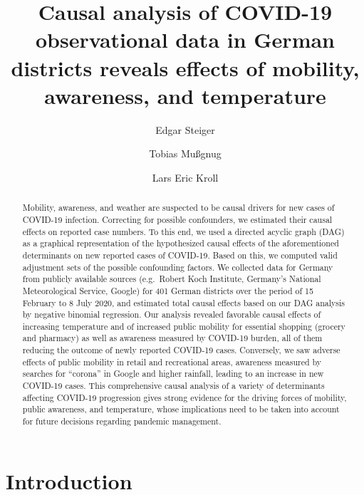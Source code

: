 \documentclass[]{elsarticle} %
\begin{document}
\begin{frontmatter}

  \title{Causal analysis of COVID-19 observational data in German districts
reveals effects of mobility, awareness, and temperature}
    \author[Zi]{Edgar Steiger}
    \author[Zi]{Tobias Mußgnug}
    \author[Zi]{Lars Eric Kroll}
      \address[Zi]{Central Research Institute of Ambulatory Health Care in Germany (Zi),
Salzufer 8, D-10587 Berlin, Germany}
    
  \begin{abstract}
  Mobility, awareness, and weather are suspected to be causal drivers for
  new cases of COVID-19 infection. Correcting for possible confounders, we
  estimated their causal effects on reported case numbers. To this end, we
  used a directed acyclic graph (DAG) as a graphical representation of the
  hypothesized causal effects of the aforementioned determinants on new
  reported cases of COVID-19. Based on this, we computed valid adjustment
  sets of the possible confounding factors. We collected data for Germany
  from publicly available sources (e.g.~Robert Koch Institute, Germany's
  National Meteorological Service, Google) for 401 German districts over
  the period of 15 February to 8 July 2020, and estimated total causal
  effects based on our DAG analysis by negative binomial regression. Our
  analysis revealed favorable causal effects of increasing temperature and
  of increased public mobility for essential shopping (grocery and
  pharmacy) as well as awareness measured by COVID-19 burden, all of them
  reducing the outcome of newly reported COVID-19 cases. Conversely, we
  saw adverse effects of public mobility in retail and recreational areas,
  awareness measured by searches for ``corona'' in Google and higher
  rainfall, leading to an increase in new COVID-19 cases. This
  comprehensive causal analysis of a variety of determinants affecting
  COVID-19 progression gives strong evidence for the driving forces of
  mobility, public awareness, and temperature, whose implications need to
  be taken into account for future decisions regarding pandemic
  management.
  \end{abstract}
  
 \end{frontmatter}

\section{Introduction}\label{introduction}
\end{document}
